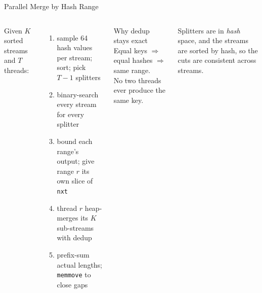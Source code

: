 \documentclass[aspectratio=169,t]{beamer}
\begin{document}
\begin{frame}{Parallel Merge by Hash Range}
\small
\begin{columns}[c]
Given $K$ sorted streams and $T$ threads:
\begin{enumerate}
  \item sample 64 hash values per stream; sort; pick $T{-}1$ splitters
  \item binary-search every stream for every splitter
  \item bound each range's output; give range $r$ its own slice of \texttt{nxt}
  \item thread $r$ heap-merges its $K$ sub-streams with dedup
  \item prefix-sum actual lengths; \texttt{memmove} to close gaps
\end{enumerate}

\vspace{0.15cm}
\begin{exampleblock}{Why dedup stays exact}
  Equal keys $\Rightarrow$ equal hashes $\Rightarrow$ same range.\\
  No two threads ever produce the same key.
\end{exampleblock}

\centering
{}

\vspace{0.1cm}
{\small Splitters are in \emph{hash} space, and the streams are
sorted by hash, so the cuts are consistent across streams.}
\end{columns}
\end{frame}
\end{document}
